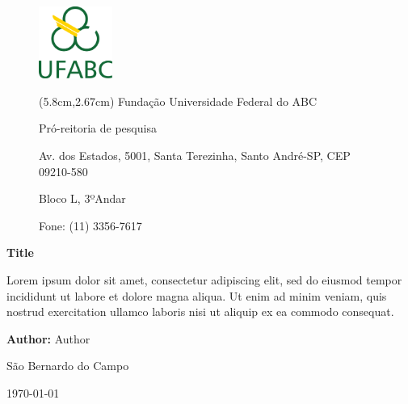 \begin{figure}
    \includegraphics[width=2.4cm]{sections/figures/logo.png}
    \label{fig:ufabc}
        
    \begin{textblock*}{12cm}(5.8cm,2.67cm) %
        \small
        \singlespacing
        Fundação Universidade Federal do ABC
            
        Pró-reitoria de pesquisa
            
        Av. dos Estados, 5001, Santa Terezinha, Santo André-SP, CEP 09210-580
            
        Bloco L, 3ºAndar
        
        Fone: (11) 3356-7617
    \end{textblock*}
    \vspace{4cm}
\end{figure}
   
\begin{center}
    \huge \textbf{Title} \vspace{0.5cm}
\end{center}

\begin{changemargin}{10cm}{0cm}
    \vspace{3.5cm}
    \noindent Lorem ipsum dolor sit amet, consectetur adipiscing elit, sed do eiusmod tempor incididunt ut labore et dolore magna aliqua. Ut enim ad minim veniam, quis nostrud exercitation ullamco laboris nisi ut aliquip ex ea commodo consequat. 
    \vspace{5cm}
\end{changemargin}

\begin{onehalfspace}
\noindent
\textbf{Author:} Author \\
\end{onehalfspace}
\begin{center}
    \onehalfspacing
    São Bernardo do Campo

    \today
\end{center}

\date{\vspace{-2cm}} %